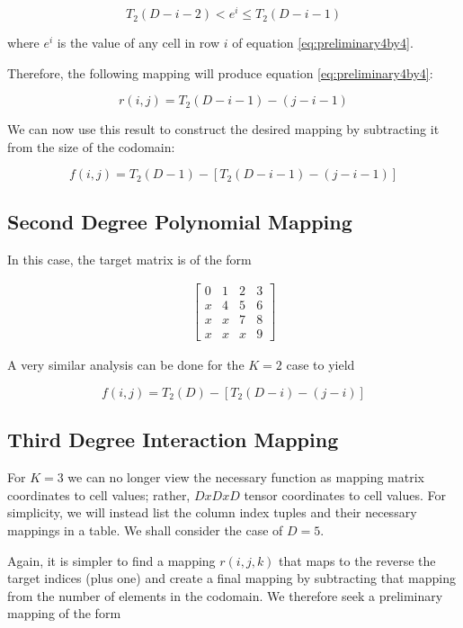 \documentclass[journal]{journal}
\begin{document}
\begin{equation}
T_2(D-i-2) < e^i \le T_2(D-i-1)
\end{equation}

where $e^i$ is the value of any cell in row $i$ of equation \ref{eq:preliminary4by4}.

Therefore, the following mapping will produce equation \ref{eq:preliminary4by4}:

\begin{equation}
r(i, j) = T_2(D-i-1) - (j - i - 1)
\end{equation}

We can now use this result to construct the desired mapping by subtracting it from the size of the codomain:

\begin{equation}
f(i, j) = T_2(D-1) - [T_2(D-i-1) - (j - i - 1)]
\end{equation}

\subsection{Second Degree Polynomial Mapping}
In this case, the target matrix is of the form

\begin{align}
\begin{bmatrix}
0 & 1 & 2 & 3 \\
x & 4 & 5 & 6 \\
x & x & 7 & 8 \\
x & x & x & 9
\end{bmatrix}
\label{eq:4by4mat_poly}
\end{align}

A very similar analysis can be done for the $K=2$ case to yield

\begin{equation}
f(i, j) = T_2(D) - [T_2(D-i) - (j - i)]
\end{equation}

\subsection{Third Degree Interaction Mapping}
For $K=3$ we can no longer view the necessary function as mapping matrix coordinates to cell values; rather, $DxDxD$ tensor coordinates to cell values.
For simplicity, we will instead list the column index tuples and their necessary mappings in a table.
We shall consider the case of $D=5$.

Again, it is simpler to find a mapping $r(i, j, k)$ that maps to the reverse the target indices (plus one) and create a final mapping by subtracting that mapping from the number of elements in the codomain.
We therefore seek a preliminary mapping of the form
\end{document}

